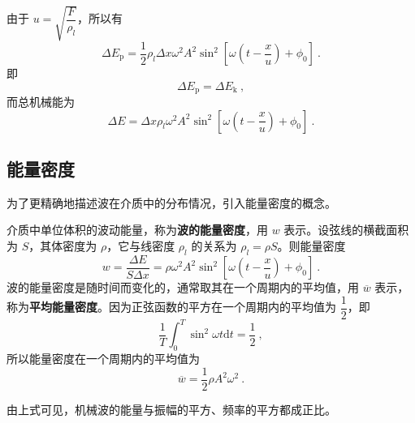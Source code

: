 由于 $u=\sqrt{\dfrac{F}{\rho_{l}}}$，所以有
\begin{equation}
\Delta E_{\mathrm{p}}=\frac{1}{2} \rho_{l} \Delta x \omega^{2} A^{2} \sin ^{2}\left[\omega\left(t-\frac{x}{u}\right)+\phi_{0}\right]~.
\end{equation}
即
\begin{equation}
\Delta E_{\mathrm{p}}=\Delta E_{\mathrm{k}}~,
\end{equation}
而总机械能为
\begin{equation}
\Delta E=\Delta x \rho_{l} \omega^{2} A^{2} \sin ^{2}\left[\omega\left(t-\frac{x}{u}\right)+\phi_{0}\right]~.
\end{equation}

\subsection{能量密度}

为了更精确地描述波在介质中的分布情况，引入能量密度的概念。

介质中单位体积的波动能量，称为\textbf{波的能量密度}，用 $w$ 表示。设弦线的横截面积为 $S$，其体密度为 $\rho$，它与线密度 $\rho_l$ 的关系为 $\rho_l=\rho S$。则能量密度
\begin{equation}
w=\frac{\Delta E}{S \Delta x}=\rho \omega^{2} A^{2} \sin ^{2}\left[\omega\left(t-\frac{x}{u}\right)+\phi_{0}\right]~.
\end{equation}
波的能量密度是随时间而变化的，通常取其在一个周期内的平均值，用 $\overline w$ 表示，称为\textbf{平均能量密度}。因为正弦函数的平方在一个周期内的平均值为 $\dfrac 12$，即
\begin{equation}
\frac{1}{T} \int_{0}^{T} \sin ^{2} \omega t \mathrm{d} t=\frac{1}{2}~,
\end{equation}
所以能量密度在一个周期内的平均值为
\begin{equation}
\overline{w}=\frac{1}{2} \rho A^{2} \omega^{2}~.
\end{equation}

由上式可见，机械波的能量与振幅的平方、频率的平方都成正比。
